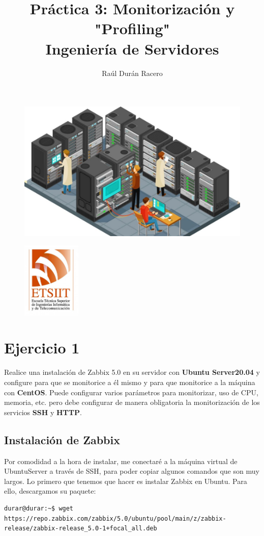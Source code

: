 \documentclass[a4paper]{article}
\begin{document}
\pagestyle{plain}
\title{Práctica 3: Monitorización y "Profiling" \\ 
Ingeniería de Servidores}
\author{Raúl Durán Racero}
\begin{figure}
    \centering
    \includegraphics[width=1.25\textwidth]{servers.pdf}
\end{figure}
\maketitle
\begin{figure}
    \centering
    \includegraphics[width=0.25\textwidth]{logoEtsiit.pdf}
\end{figure}

\newpage
\tableofcontents
\newpage
\section{Ejercicio 1}
Realice una instalación de Zabbix 5.0 en su servidor con \textbf{Ubuntu Server20.04} y configure
para que se monitorice a él mismo y para que monitorice a la máquina con \textbf{CentOS}.
Puede configurar varios parámetros para monitorizar, uso de CPU, memoria, etc. pero
debe configurar de manera obligatoria la monitorización de los servicios \textbf{SSH} y \textbf{HTTP}.
\subsection{Instalación de Zabbix}
Por comodidad a la hora de instalar, me conectaré a la máquina virtual de UbuntuServer
a través de SSH, para poder copiar algunos comandos que son muy largos.\newline
Lo primero que tenemos que hacer es instalar Zabbix en Ubuntu. Para ello, 
descargamos su paquete:

\begin{lstlisting}
durar@durar:~$ wget https://repo.zabbix.com/zabbix/5.0/ubuntu/pool/main/z/zabbix-release/zabbix-release_5.0-1+focal_all.deb
\end{lstlisting}
\end{document}
